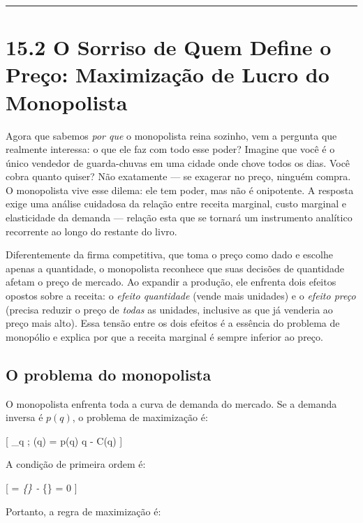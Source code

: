 \documentclass[11pt,twoside,openright]{book}
\begin{document}
\begin{center}\rule{0.5\linewidth}{0.5pt}\end{center}

\section{15.2 O Sorriso de Quem Define o Preço: Maximização de Lucro do
Monopolista}\label{152}

Agora que sabemos \emph{por que} o monopolista reina sozinho, vem a
pergunta que realmente interessa: o que ele faz com todo esse poder?
Imagine que você é o único vendedor de guarda-chuvas em uma cidade onde
chove todos os dias. Você cobra quanto quiser? Não exatamente --- se
exagerar no preço, ninguém compra. O monopolista vive esse dilema: ele
tem poder, mas não é onipotente. A resposta exige uma análise cuidadosa
da relação entre receita marginal, custo marginal e elasticidade da
demanda --- relação esta que se tornará um instrumento analítico
recorrente ao longo do restante do livro.

Diferentemente da firma competitiva, que toma o preço como dado e
escolhe apenas a quantidade, o monopolista reconhece que suas decisões
de quantidade afetam o preço de mercado. Ao expandir a produção, ele
enfrenta dois efeitos opostos sobre a receita: o \emph{efeito
quantidade} (vende mais unidades) e o \emph{efeito preço} (precisa
reduzir o preço de \emph{todas} as unidades, inclusive as que já
venderia ao preço mais alto). Essa tensão entre os dois efeitos é a
essência do problema de monopólio e explica por que a receita marginal é
sempre inferior ao preço.

\subsection{O problema do monopolista}\label{o-problema-do-monopolista}

O monopolista enfrenta toda a curva de demanda do mercado. Se a demanda
inversa é \(p(q)\), o problema de maximização é:

{[} \max\_q ; \pi(q) = p(q) \cdot q - C(q) \label{eq:15.1} 
{]}

A condição de primeira ordem é:

{[}  =
\emph{\{\}
- }\{\} = 0 \label{eq:15.2}
 {]}

Portanto, a regra de maximização é:
\end{document}
